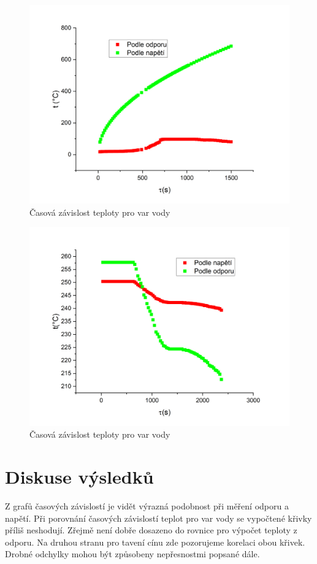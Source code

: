 \begin{figure}[h]
    \centering
    \includegraphics[width=0.5\linewidth]{8 - Kalibrace odporového teploměru a termočlánku//Prototkol - kalibrace teploměru//img/Závislost teploty na čase, var.png}
    \caption{Časová závislost teploty pro var vody}
    \label{fig:teplota-na-case-var}
\end{figure}

\begin{figure}[h]
    \centering
    \includegraphics[width=0.5\linewidth]{8 - Kalibrace odporového teploměru a termočlánku//Prototkol - kalibrace teploměru//img/Závislost teploty na čase, cín.png}
    \caption{Časová závislost teploty pro var vody}
    \label{fig:telota-na-case-cin}
\end{figure}

\newpage
\section{Diskuse výsledků}

Z grafů časových závislostí je vidět výrazná podobnost při měření odporu a napětí. Při porovnání časových závislostí teplot pro var vody se vypočtené křivky příliš neshodují. Zřejmě není dobře dosazeno do rovnice pro výpočet teploty z odporu. Na druhou stranu pro tavení cínu zde pozorujeme korelaci obou křivek. Drobné odchylky mohou být způsobeny nepřesnostmi popsané dále.

